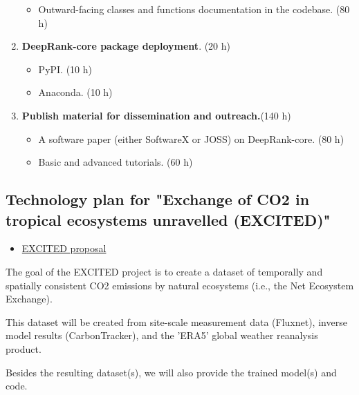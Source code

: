 \begin{enumerate}[start=1,leftmargin=.8in,label={\bfseries \textbullet{} Task \arabic*:}]
\begin{itemize}[label=o]
        \item Outward-facing classes and functions documentation in the codebase. (80 h)
    \end{itemize}
    \item \textbf{DeepRank-core package deployment}. (20 h)
    \begin{itemize}[label=o]
        \item PyPI. (10 h)
        \item Anaconda. (10 h)
    \end{itemize}
    \item \textbf{Publish material for dissemination and outreach.}(140 h)
    \begin{itemize}[label=o]
        \item A software paper (either SoftwareX or JOSS) on DeepRank-core. (80 h)
        \item Basic and advanced tutorials. (60 h)
    \end{itemize}
\end{enumerate}


\clearpage
\subsection{Technology plan for "Exchange of CO2 in tropical ecosystems unravelled (EXCITED)"}

\bigskip
\begin{itemize}
\item \href{https://nlesc.sharepoint.com/:b:/s/all/EZ6Iu_0k89tLkdZALfb7QagBD6t2hy4UkI8jYjyMHoVFnw?e=5BldjB}{EXCITED proposal}
\end{itemize}
\begin{description}[fullwidth,style=nextline]
    \item[] The goal of the EXCITED project is to create a dataset of temporally and spatially consistent CO2 emissions by natural
    ecosystems (i.e., the Net Ecosystem Exchange). 
    \item[] This dataset will be created from site-scale measurement data (Fluxnet), inverse model results (CarbonTracker), and the 'ERA5' global weather reanalysis product. 
    \item[] Besides the resulting dataset(s), we will also provide the trained model(s) and code. 
\end{description}

